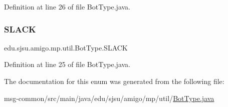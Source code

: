 Definition at line 26 of file Bot\+Type.\+java.

\mbox{\label{enumedu_1_1sjsu_1_1amigo_1_1mp_1_1util_1_1_bot_type_a639fbb7486fe688b082dfc1744ebb81e}} 
\subsubsection{\texorpdfstring{S\+L\+A\+CK}{SLACK}}
{\footnotesize\ttfamily edu.\+sjsu.\+amigo.\+mp.\+util.\+Bot\+Type.\+S\+L\+A\+CK}



Definition at line 25 of file Bot\+Type.\+java.



The documentation for this enum was generated from the following file\+:\begin{DoxyCompactItemize}
\item 
msg-\/common/src/main/java/edu/sjsu/amigo/mp/util/\hyperlink{_bot_type_8java}{Bot\+Type.\+java}\end{DoxyCompactItemize}
